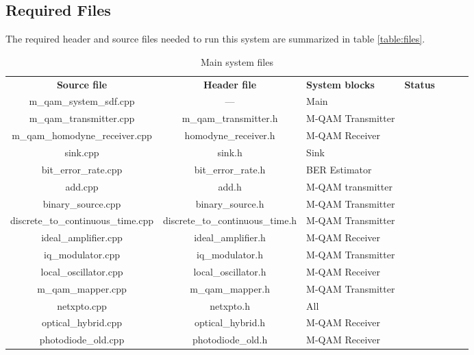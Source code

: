 \subsection*{Required Files}

The required header and source files needed to run this system are summarized in table \ref{table:files}.

\begin{table}[]
	\centering
	\label{files_table}
	\caption{Main system files}
	\begin{tabular}{|c|c|p{35mm}|c|ccc}
		\cline{1-4}
		\textbf{Source file} & \textbf{Header file}  &  \textbf{System blocks} & \textbf{Status} & \\ \cline{1-4}
		m\_qam\_system\_sdf.cpp & --- & Main &\checkmark & \\ \cline{1-4}
		m\_qam\_transmitter.cpp & m\_qam\_transmitter.h & M-QAM Transmitter & \checkmark &  \\ \cline{1-4}
		m\_qam\_homodyne\_receiver.cpp & homodyne\_receiver.h & M-QAM Receiver & \checkmark &  \\ \cline{1-4}
		sink.cpp & sink.h & Sink & \checkmark & \\ \cline{1-4}
		bit\_error\_rate.cpp & bit\_error\_rate.h & BER Estimator & \checkmark &\\ \cline{1-4}
		add.cpp & add.h & M-QAM transmitter & \checkmark & \\ \cline{1-4}
		binary\_source.cpp & binary\_source.h & M-QAM Transmitter & \checkmark & \\ \cline{1-4}
		discrete\_to\_continuous\_time.cpp & discrete\_to\_continuous\_time.h & M-QAM Transmitter & \checkmark & \\ \cline{1-4}
		ideal\_amplifier.cpp & ideal\_amplifier.h & M-QAM Receiver & \checkmark & \\ \cline{1-4}
		iq\_modulator.cpp & iq\_modulator.h & M-QAM Transmitter & \checkmark & \\ \cline{1-4}
		local\_oscillator.cpp & local\_oscillator.h & M-QAM Receiver & \checkmark & \\ \cline{1-4}
		m\_qam\_mapper.cpp & m\_qam\_mapper.h & M-QAM Transmitter & \checkmark & \\ \cline{1-4}
		netxpto.cpp & netxpto.h & All & \checkmark & \\ \cline{1-4}
		optical\_hybrid.cpp & optical\_hybrid.h & M-QAM Receiver & \checkmark & \\ \cline{1-4}
		photodiode\_old.cpp & photodiode\_old.h & M-QAM Receiver & \checkmark & \\ \cline{1-4}

\end{tabular}
\end{table}
